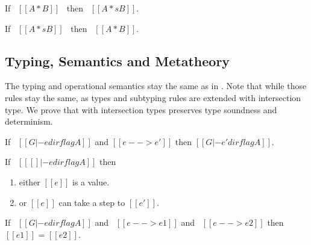 \begin{lemma}
  If \ $[[A * B]]$ \ then \ $[[A *s B]]$.
\label{lemma:inter:disj-sound}
\end{lemma}

\begin{lemma}
  If \ $[[A *s B]]$ \ then \ $[[A * B]]$.
\label{lemma:inter:disj-complete}
\end{lemma}

\subsection{Typing, Semantics and Metatheory}

The typing and operational semantics stay the same as in . Note
that while those rules stay the same, as types and subtyping rules are extended
with intersection type.
We prove that \cal with intersection types preserves type soundness and determinism.

\begin{lemma}
\label{lemma:inter:preservation}
  If \ $[[G |- e dirflag A]]$ and $[[e --> e']]$ then $[[G |- e' dirflag A]]$.
\end{lemma}

\begin{lemma}[Progress]
\label{lemma:inter:progress}
If \ $[[ [] |- e dirflag A]]$ then
 \begin{enumerate}
  \item either $[[e]]$ is a value.
  \item or $[[e]]$ can take a step to $[[e']]$.
  \end{enumerate}
\end{lemma}

\begin{theorem}[Determinism]
\label{lemma:inter:determinism}
  If \ $[[G |- e dirflag A]]$ and \ $[[e --> e1]]$ and \ $[[e --> e2]]$ then $[[e1]]$ = $[[e2]]$.
\end{theorem}

\begin{comment}
\begin{lemma}[Substitution]
\label{lemma:inter:substitution}
  If \ $[[G, x:B , G1 |- e dirflag A]]$ \ and \ $[[G |- e' => B]]$
  then \ $[[G, G1 |- e [ x ~> e' ] dirflag A]]$
\end{lemma}
\end{comment}

